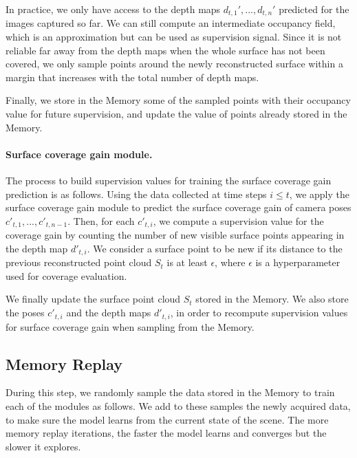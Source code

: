 In practice, we only have access to the depth maps $d_{t, 1}', ..., d_{t,n}'$ predicted for the images captured so far. We can still compute an intermediate occupancy field, which is an approximation but can be used as supervision signal. Since it is not reliable far away from the depth maps when the whole surface has not been covered, we only sample points around the newly reconstructed surface within a margin that increases with the total number of depth maps. 

Finally, we store in the Memory some of the sampled points with their occupancy value for future supervision, and update the value of points already stored in the Memory.

\paragraph{Surface coverage gain module.} The process to build supervision values for training the surface coverage gain prediction is as follows. Using the data collected at time steps $i\leq t$, we apply the surface coverage gain module to predict the surface coverage gain of camera poses $c'_{t,1}, ..., c'_{t,n-1}$. Then, for each $c'_{t,i}$, we compute a supervision value for the coverage gain by counting the number of new visible surface points appearing in the depth map $d'_{t, i}$.  
%
We consider a surface point to be new if its distance to the previous reconstructed point cloud $S_t$ is at least $\epsilon$, where $\epsilon$ is a hyperparameter used for coverage evaluation.

We finally update the surface point cloud $S_t$ stored in the Memory. We also store the poses $c'_{t,i}$ and the depth maps $d'_{t,i}$, in order to recompute supervision values for surface coverage gain when sampling from the Memory.

\subsection{Memory Replay}

During this step, we randomly sample the data stored in the Memory to train each of the modules as follows. We add to these samples the newly acquired data, to make sure the model learns from the current state of the scene. The more memory replay iterations, the faster the model learns and converges but the slower it explores.

